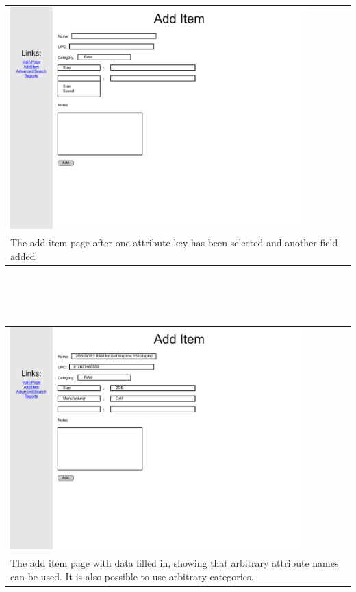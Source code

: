 \documentclass{article}
\begin{document}
~\\
\begin{tabular}{ p{4.5in} }
\includegraphics[keepaspectratio, width=4.5in]{addItemF0S3.pdf}\\
The add item page after one attribute key has been selected and another field added
\end{tabular}\\
~\\
~\\
\begin{tabular}{ p{4.5in} }
\includegraphics[keepaspectratio, width=4.5in]{addItemF0S5.pdf}\\
The add item page with data filled in, showing that arbitrary attribute names can be used.  It is also possible to use arbitrary categories.
\end{tabular}\\
~\\
~\\
\end{document}
